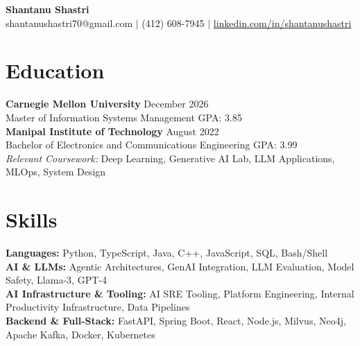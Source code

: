 \documentclass[11pt,a4paper]{article}
\begin{document}
\begin{center}
    \Huge \textbf{Shantanu Shastri} \\
    \vspace{2pt}
    \small shantanushastri70@gmail.com $|$ (412) 608-7945 $|$ \href{https://linkedin.com/in/shantanushastri}{linkedin.com/in/shantanushastri}
\end{center}

\vspace{-5pt}
\section{Education}
\noindent
\textbf{Carnegie Mellon University} \hfill December 2026 \\
Master of Information Systems Management \hfill GPA: 3.85 \\
\textbf{Manipal Institute of Technology} \hfill August 2022 \\
Bachelor of Electronics and Communications Engineering \hfill GPA: 3.99 \\
\textit{Relevant Coursework:} Deep Learning, Generative AI Lab, LLM Applications, MLOps, System Design

\vspace{-5pt}
\section{Skills}
\noindent
\textbf{Languages:} Python, TypeScript, Java, C++, JavaScript, SQL, Bash/Shell \\
\textbf{AI \& LLMs:} Agentic Architectures, GenAI Integration, LLM Evaluation, Model Safety, Llama-3, GPT-4 \\
\textbf{AI Infrastructure \& Tooling:} AI SRE Tooling, Platform Engineering, Internal Productivity Infrastructure, Data Pipelines \\
\textbf{Backend \& Full-Stack:} FastAPI, Spring Boot, React, Node.js, Milvus, Neo4j, Apache Kafka, Docker, Kubernetes

\vspace{-5pt}
\end{document}
